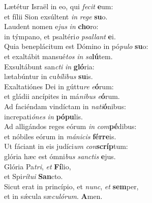 \evenverse Lætétur Israël in eo, qui \textit{fe}\textit{cit} \textbf{e}um:~\*\\
\evenverse et fílii Sion exsúltent \textit{in} \textit{re}\textit{ge} \textbf{su}o.\\
\oddverse Laudent nomen e\textit{jus} \textit{in} \textbf{cho}ro:~\*\\
\oddverse in týmpano, et psaltéri\textit{o} \textit{psal}\textit{lant} \textbf{e}i.\\
\evenverse Quia beneplácitum est Dómino in pó\textit{pu}\textit{lo} \textbf{su}o:~\*\\
\evenverse et exaltábit mansué\textit{tos} \textit{in} \textit{sa}\textbf{lú}tem.\\
\oddverse Exsultábunt san\textit{cti} \textit{in} \textbf{gló}ria:~\*\\
\oddverse lætabúntur in cu\textit{bí}\textit{li}\textit{bus} \textbf{su}is.\\
\evenverse Exaltatiónes Dei in gúttu\textit{re} \textit{e}\textbf{ó}rum:~\*\\
\evenverse et gládii ancípites in má\textit{ni}\textit{bus} \textit{e}\textbf{ó}rum.\\
\oddverse Ad faciéndam vindíctam in \textit{na}\textit{ti}\textbf{ó}nibus:~\*\\
\oddverse increpati\textit{ó}\textit{nes} \textit{in} \textbf{pó}\textbf{pu}lis.\\
\evenverse Ad alligándos reges eórum \textit{in} \textit{com}\textbf{pé}dibus:~\*\\
\evenverse et nóbiles eórum in \textit{má}\textit{ni}\textit{cis} \textbf{fér}\textbf{re}is.\\
\oddverse Ut fáciant in eis judíci\textit{um} \textit{con}\textbf{scríp}tum:~\*\\
\oddverse glória hæc est ómni\textit{bus} \textit{san}\textit{ctis} \textbf{e}jus.\\
\evenverse Glória Pa\textit{tri}, \textit{et} \textbf{Fí}lio,~\*\\
\evenverse et Spi\textit{rí}\textit{tu}\textit{i} \textbf{San}cto.\\
\oddverse Sicut erat in princípio, et \textit{nunc}, \textit{et} \textbf{sem}per,~\*\\
\oddverse et in sǽcula sæ\textit{cu}\textit{ló}\textit{rum}. \textbf{A}men.\\
